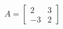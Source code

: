 \documentclass[preview]{standalone}
\begin{document}
\begin{align*}
A = \begin{bmatrix} 2 & 3 \\ -3 & 2 \end{bmatrix}
\end{align*}
\end{document}
